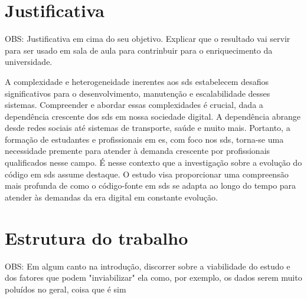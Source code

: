 \section{Justificativa}\label{sec:justificativa}
OBS: Justificativa em cima do seu objetivo.
Explicar que o resultado vai servir para ser usado em sala de aula para contrinbuir para o enriquecimento da universidade.

A complexidade e heterogeneidade inerentes aos \gls{sds} estabelecem desafios significativos para o desenvolvimento, manutenção e escalabilidade desses sistemas. Compreender e abordar essas complexidades é crucial, dada a dependência crescente dos \gls{sds} em nossa sociedade digital. A dependência abrange desde redes sociais até sistemas de transporte, saúde e muito mais. Portanto, a formação de estudantes e profissionais em \gls{es}, com foco nos \gls{sds}, torna-se uma necessidade premente para atender à demanda crescente por profissionais qualificados nesse campo.
É nesse contexto que a investigação sobre a evolução do código em \gls{sds} assume destaque. O estudo visa proporcionar uma compreensão mais profunda de como o código-fonte em \gls{sds} se adapta ao longo do tempo para atender às demandas da era digital em constante evolução.

\section{Estrutura do trabalho}\label{sec:estruturaTrabalho}

OBS: Em algum canto na introdução, discorrer sobre a viabilidade do estudo e dos fatores que podem "inviabilizar" ela como, por exemplo, os dados serem muito poluídos no geral, coisa que é sim